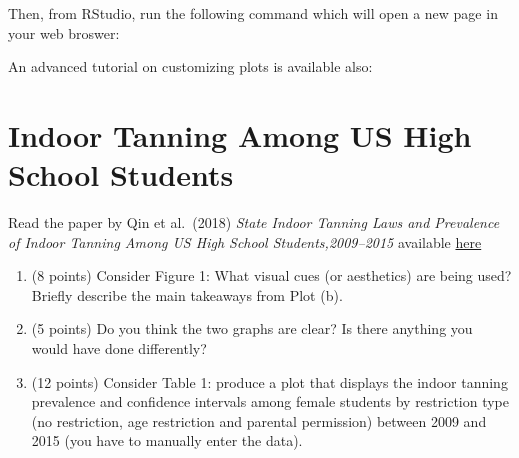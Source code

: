 \documentclass[letterpaper,11pt,twoside,]{pinp}
\providecommand{\tightlist}{%
  \setlength{\itemsep}{0pt}\setlength{\parskip}{0pt}}
\begin{document}
Then, from RStudio, run the following command which will open a new page
in your web broswer:

\begin{Shaded}
\begin{Highlighting}[]
\OperatorTok{::}\NormalTok{(}\NormalTok{, } \NormalTok{)}
\end{Highlighting}
\end{Shaded}

An advanced tutorial on customizing plots is available also:

\begin{Shaded}
\begin{Highlighting}[]
\OperatorTok{::}\NormalTok{(}\NormalTok{, } \NormalTok{)}
\end{Highlighting}
\end{Shaded}

\hypertarget{indoor-tanning-among-us-high-school-students}{%
\section{Indoor Tanning Among US High School
Students}\label{indoor-tanning-among-us-high-school-students}}

Read the paper by Qin et al.~(2018) \emph{State Indoor Tanning Laws and
Prevalence of Indoor Tanning Among US High School Students,2009--2015}
available
\href{https://sahirbhatnagar.com/EPIB607/terms-and-concepts.html}{here}

\begin{enumerate}
\def\labelenumi{\alph{enumi})}
\tightlist
\item
  (8 points) Consider Figure 1: What visual cues (or aesthetics) are
  being used? Briefly describe the main takeaways from Plot (b).
\item
  (5 points) Do you think the two graphs are clear? Is there anything
  you would have done differently?
\item
  (12 points) Consider Table 1: produce a plot that displays the indoor
  tanning prevalence and confidence intervals among female students by
  restriction type (no restriction, age restriction and parental
  permission) between 2009 and 2015 (you have to manually enter the
  data).
\end{enumerate}
\end{document}

